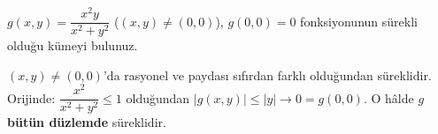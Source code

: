 \begin{soru}
$g(x,y)=\dfrac{x^2y}{x^2+y^2}$ ($(x,y)\neq(0,0)$), $g(0,0)=0$ fonksiyonunun sürekli olduğu kümeyi bulunuz.
\end{soru}
\begin{cevap}
$(x,y)\neq(0,0)$'da rasyonel ve paydası sıfırdan farklı olduğundan süreklidir. Orijinde:
$\dfrac{x^2}{x^2+y^2}\le1$ olduğundan $|g(x,y)|\le|y|\to0=g(0,0)$. O hâlde $g$ \textbf{bütün düzlemde} süreklidir.
\end{cevap}
